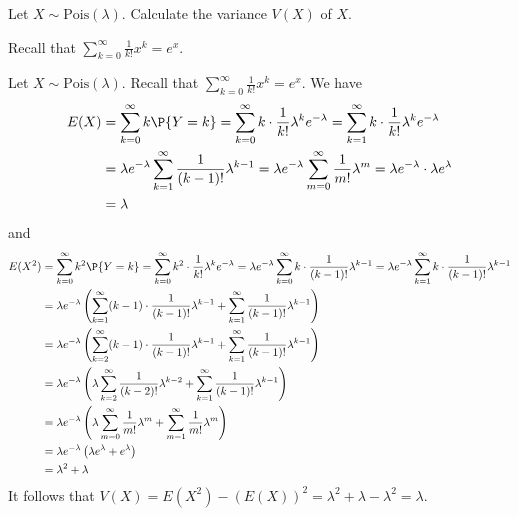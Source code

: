 \begin{exercise}
	Let $X \sim \text{Pois}(\lambda)$. Calculate the variance $V(X)$ of $X$.
	\begin{hint}
		Recall that $\sum_{k = 0}^{\infty} \frac{1}{k!} x^k = e^x$.
	\end{hint}
	\begin{solution}
		Let $X \sim \text{Pois}(\lambda)$. Recall that $\sum_{k = 0}^{\infty} \frac{1}{k!} x^k = e^x$. We have
		\begin{align*}
			E(X) & = \sum_{k = 0}^{\infty} k \P{Y = k} = \sum_{k = 0}^{\infty} k \cdot \frac{1}{k!} \lambda^k e^{-\lambda} = \sum_{k = 1}^{\infty} k \cdot \frac{1}{k!} \lambda^k e^{-\lambda} \\
			& = \lambda e^{-\lambda} \sum_{k = 1}^{\infty} \frac{1}{(k - 1)!} \lambda^{k - 1} = \lambda e^{-\lambda} \sum_{m = 0}^{\infty} \frac{1}{m!} \lambda^m = \lambda e^{-\lambda} \cdot \lambda e^{\lambda} \\
			& = \lambda
		\end{align*}
		and
		\begin{align*}
			E(X^2) & = \sum_{k = 0}^{\infty} k^2 \P{Y = k} = \sum_{k = 0}^{\infty} k^2 \cdot \frac{1}{k!} \lambda^k e^{-\lambda} = \lambda e^{-\lambda} \sum_{k = 0}^{\infty} k \cdot \frac{1}{(k - 1)!} \lambda^{k - 1} = \lambda e^{-\lambda} \sum_{k = 1}^{\infty} k \cdot \frac{1}{(k - 1)!} \lambda^{k - 1} \\
			& = \lambda e^{-\lambda} \left(\sum_{k = 1}^{\infty} (k - 1) \cdot \frac{1}{(k - 1)!} \lambda^{k - 1} + \sum_{k = 1}^{\infty} \frac{1}{(k - 1)!} \lambda^{k - 1}\right) \\
			& = \lambda e^{-\lambda} \left(\sum_{k = 2}^{\infty} (k - 1) \cdot \frac{1}{(k - 1)!} \lambda^{k - 1} + \sum_{k = 1}^{\infty} \frac{1}{(k - 1)!} \lambda^{k - 1}\right) \\
			& = \lambda e^{-\lambda} \left(\lambda \sum_{k = 2}^{\infty} \frac{1}{(k - 2)!} \lambda^{k - 2} + \sum_{k = 1}^{\infty} \frac{1}{(k - 1)!} \lambda^{k - 1}\right) \\
			& = \lambda e^{-\lambda} \left(\lambda \sum_{m = 0}^{\infty} \frac{1}{m!} \lambda^m + \sum_{m = 1}^{\infty} \frac{1}{m!} \lambda^m\right) \\
			& = \lambda e^{-\lambda} \left(\lambda e^{\lambda} + e^{\lambda}\right) \\
			& = \lambda^2 + \lambda \\
		\end{align*}
		It follows that $V(X) = E(X^2) - (E(X))^2 = \lambda^2 + \lambda - \lambda^2 = \lambda$.
	\end{solution}
\end{exercise}

